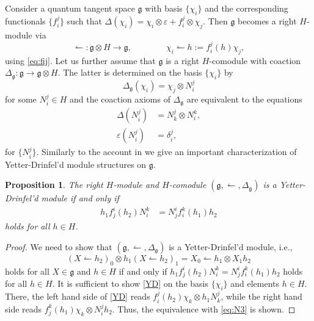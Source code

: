 \documentclass{article}
\newtheorem{proposition}[thm]{Proposition}
\theoremstyle{definition}
\begin{document}
	Consider a quantum tangent space $\mathfrak{g}$ with basis $\{\chi_i\}$ and the corresponding functionals $\{f_i^j\}$ such that $\Delta(\chi_i)=\chi_i\otimes\varepsilon+f_i^j\otimes\chi_j$. Then $\mathfrak{g}$ becomes a right $H$-module via
	\begin{equation}\label{eq:leftharpoon}
		\leftharpoonup\colon\mathfrak{g}\otimes H\to\mathfrak{g},\qquad\qquad \chi_i\leftharpoonup h:=f_i^j(h)\chi_j,
	\end{equation}
	using \eqref{eq:fij}. Let us further assume that $\mathfrak{g}$ is a right $H$-comodule with coaction $\Delta_\mathfrak{g}\colon\mathfrak{g}\to\mathfrak{g}\otimes H$. The latter is determined on the basis $\{\chi_i\}$ by 
	\begin{equation}\label{eq:gcoact}
		\Delta_\mathfrak{g}(\chi_i)=\chi_j\otimes N_i^j
	\end{equation} 
	for some $N_i^j\in H$ and the coaction axioms of $\Delta_\mathfrak{g}$ are equivalent to the equations
	\begin{align}
		\Delta(N^j_i)
		&=N^j_k\otimes N^k_i,\label{eq:N1}\\
		\varepsilon(N^j_i)
		&=\delta^j_i,\label{eq:N2}
	\end{align}
	for $\{N_i^j\}$. Similarly to the account in \cite[Section 4]{SchYD} we give
	an important characterization of Yetter-Drinfel'd module structures on $\mathfrak{g}$.
	
	\begin{proposition}
		The right $H$-module and $H$-comodule $(\mathfrak{g},\leftharpoonup,\Delta_\mathfrak{g})$ is a Yetter-Drinfel'd module if and only if
		\begin{align}
			h_1f^i_j(h_2)N^k_i
			&=N^i_jf_i^k(h_1)h_2\label{eq:N3}
		\end{align}
		holds for all $h\in H$.
	\end{proposition}
	
	\begin{proof}
		We need to show that $(\mathfrak{g},\leftharpoonup,\Delta_\mathfrak{g})$ is a {Yetter-Drinfel'd module}, i.e.,
		\begin{equation}\label{YD}
			(X\leftharpoonup h_2)_0\otimes h_1(X\leftharpoonup h_2)_1
			=X_0\leftharpoonup h_1\otimes X_1h_2
		\end{equation}
		holds for all $X\in\mathfrak{g}$ and $h\in H$ if and only if $h_1f^i_j(h_2)N^k_i=N^i_jf_i^k(h_1)h_2$ holds for all $h\in H$. It is sufficient to show \eqref{YD} on the basis $\{\chi_i\}$ and elements $h\in H$. There, the left hand side of \eqref{YD} reads $f_i^j(h_2)\chi_k\otimes h_1N_k^j$, while the right hand side reads $f_j^k(h_1)\chi_k\otimes N_i^jh_2$. Thus, the equivalence with \eqref{eq:N3} is shown.
	\end{proof}
	
\end{document}
